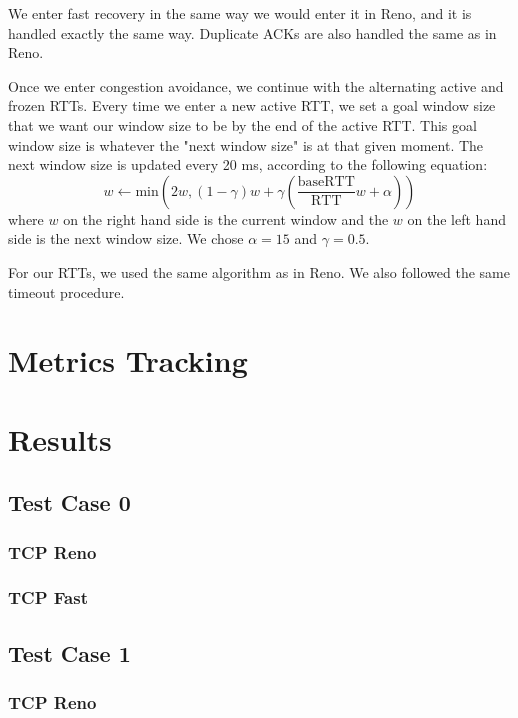 \documentclass{article}
\begin{document}
We enter fast recovery in the same way we would enter it in Reno, and it is handled exactly the same way. Duplicate ACKs are also handled the same as in Reno.

Once we enter congestion avoidance, we continue with the alternating active and frozen RTTs. Every time we enter a new active RTT, we set a goal window size that we want our window size to be by the end of the active RTT. This goal window size is whatever the "next window size" is at that given moment. The next window size is updated every 20 ms, according to the following equation: $$ w \leftarrow \textrm{min}(2w, (1-\gamma)w + \gamma(\frac{\textrm{baseRTT}}{\textrm{RTT}}w + \alpha)) $$
where $w$ on the right hand side is the current window and the $w$ on the left hand side is the next window size. We chose $\alpha = 15$ and $\gamma = 0.5$. 

For our RTTs, we used the same algorithm as in Reno. We also followed the same timeout procedure.


\section{Metrics Tracking}

\section{Results}

\subsection{Test Case 0}

\subsubsection{TCP Reno}

\subsubsection{TCP Fast}

\subsection{Test Case 1}

\subsubsection{TCP Reno}
\end{document}
